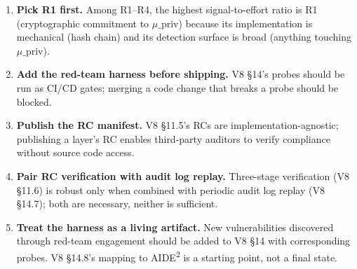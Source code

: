 \begin{enumerate}
    \item \textbf{Pick R1 first.} Among R1--R4, the highest signal-to-effort ratio is R1 (cryptographic commitment to $\mu\_{\text{priv}}$) because its implementation is mechanical (hash chain) and its detection surface is broad (anything touching $\mu\_{\text{priv}}$).
    \item \textbf{Add the red-team harness before shipping.} V8 \S14's probes should be run as CI/CD gates; merging a code change that breaks a probe should be blocked.
    \item \textbf{Publish the RC manifest.} V8 \S11.5's RCs are implementation-agnostic; publishing a layer's RC enables third-party auditors to verify compliance without source code access.
    \item \textbf{Pair RC verification with audit log replay.} Three-stage verification (V8 \S11.6) is robust only when combined with periodic audit log replay (V8 \S14.7); both are necessary, neither is sufficient.
    \item \textbf{Treat the harness as a living artifact.} New vulnerabilities discovered through red-team engagement should be added to V8 \S14 with corresponding probes. V8 \S14.8's mapping to AIDE\textsuperscript{2} is a starting point, not a final state.
\end{enumerate}
